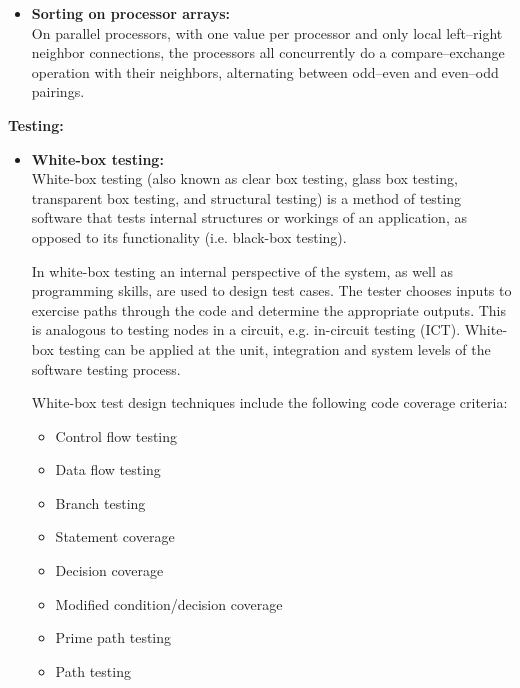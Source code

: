 \documentclass[a4paper,12pt]{article}
\begin{document}
\begin{itemize}
\item \textbf{Sorting on processor arrays:}\\
On parallel processors, with one value per processor and only local left–right neighbor connections, the processors all concurrently do a compare–exchange operation with their neighbors, alternating between odd–even and even–odd pairings.
\end{itemize}

\noindent \textbf{Testing:}
\begin{itemize}
\item \textbf{White-box testing:}\\
White-box testing (also known as clear box testing, glass box testing, transparent box testing, and structural testing) is a method of testing software that tests internal structures or workings of an application, as opposed to its functionality (i.e. black-box testing). 

In white-box testing an internal perspective of the system, as well as programming skills, are used to design test cases. The tester chooses inputs to exercise paths through the code and determine the appropriate outputs. This is analogous to testing nodes in a circuit, e.g. in-circuit testing (ICT). White-box testing can be applied at the unit, integration and system levels of the software testing process.

White-box test design techniques include the following code coverage criteria:

    
\begin{itemize}
\item Control flow testing
\end{itemize}
\begin{itemize}
\item Data flow testing
\end{itemize}
\begin{itemize}
\item Branch testing
\end{itemize}
\begin{itemize}
\item Statement coverage
\end{itemize}
\begin{itemize}
\item Decision coverage
\end{itemize}
\begin{itemize}
\item Modified condition/decision coverage
\end{itemize}
\begin{itemize}
\item Prime path testing
\end{itemize}
\begin{itemize}
\item Path testing

\end{itemize}
\end{itemize}
\end{document}
